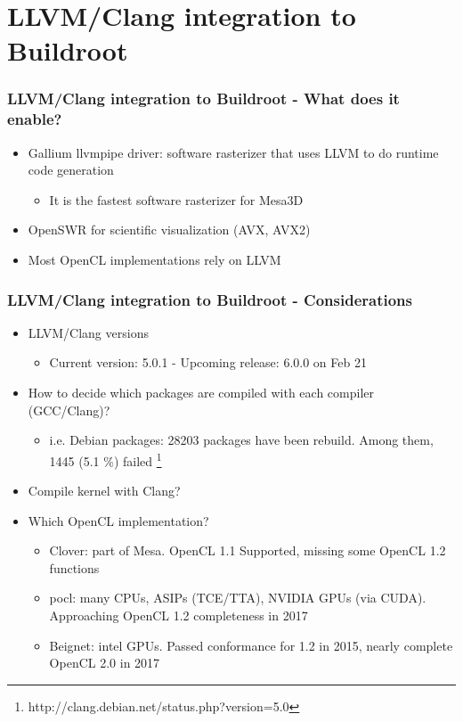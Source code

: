 \documentclass{beamer}
\begin{document}
\section{LLVM/Clang integration to Buildroot}

\begin{frame}
\frametitle{LLVM/Clang integration to Buildroot - What does it enable?}
\begin{itemize}
  \item Gallium llvmpipe driver: software rasterizer that uses LLVM to do runtime code generation
  \begin{itemize}
    \item It is the fastest software rasterizer for Mesa3D
  \end{itemize}
  \item OpenSWR for scientific visualization (AVX, AVX2)
  \item Most OpenCL implementations rely on LLVM
\end{itemize}
\end{frame}

\begin{frame}
\frametitle{LLVM/Clang integration to Buildroot - Considerations}
\begin{itemize}
  \item LLVM/Clang versions
  \begin{itemize}
    \item Current version: 5.0.1 - Upcoming release: 6.0.0 on Feb 21
  \end{itemize}
  \item How to decide which packages are compiled with each compiler (GCC/Clang)?
  \begin{itemize}
    \item i.e. Debian packages: 28203 packages have been rebuild. Among them, 1445 (5.1 \%) failed \footnote{http://clang.debian.net/status.php?version=5.0}
  \end{itemize}
  \item Compile kernel with Clang?
  \item Which OpenCL implementation?
  \begin{itemize}
    \item {\selectfont Clover}: part of Mesa. OpenCL 1.1 Supported, missing some OpenCL 1.2 functions
    \item {\selectfont pocl}: many CPUs, ASIPs (TCE/TTA), NVIDIA GPUs (via CUDA). Approaching OpenCL 1.2 completeness in 2017
    \item {\selectfont Beignet}: intel GPUs. Passed conformance for 1.2 in 2015, nearly complete OpenCL 2.0 in 2017
  \end{itemize}
\end{itemize}
\end{frame}
\end{document}

